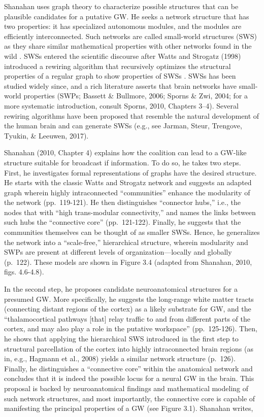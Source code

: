 \documentclass[12pt,twoside]{reedthesis}
\begin{document}
Shanahan uses graph theory to characterize possible structures that can be plausible candidates for a putative GW. He seeks a network structure that has two properties: it has specialized autonomous modules, and the modules are efficiently interconnected. Such networks are called small-world structures (SWS) as they share similar mathematical properties with other networks found in the wild . SWSs entered the scientific discourse after Watts and Strogatz (1998) introduced a rewiring algorithm that recursively optimizes the structural properties of a regular graph to show properties of SWSs . SWSs has been studied widely since, and a rich literature asserts that brain networks have small-world properties (SWPs; Bassett \& Bullmore, 2006; Sporns \& Zwi, 2004; for a more systematic introduction, consult Sporns, 2010, Chapters 3--4). Several rewiring algorithms have been proposed that resemble the natural development of the human brain and can generate SWSs (e.g., see Jarman, Steur, Trengove, Tyukin, \& Leeuwen, 2017).

Shanahan (2010, Chapter 4) explains how the coalition can lead to a GW-like structure suitable for broadcast if information. To do so, he takes two steps. First, he investigates formal representations of graphs have the desired structure. He starts with the classic Watts and Strogatz network and suggests an adapted graph wherein highly intraconnected ``communities'' enhance the modularity of the network (pp.~119-121). He then distinguishes ``connector hubs,'' i.e., the nodes that with ``high trans-modular connectivity,'' and names the links between such hubs the ``connective core'' (pp.~121-122). Finally, he suggests that the communities themselves can be thought of as smaller SWSs. Hence, he generalizes the network into a ``scale-free,'' hierarchical structure, wherein modularity and SWPs are present at different levels of organization---locally and globally (p.~122). These models are shown in Figure 3.4 (adapted from Shanahan, 2010, figs. 4.6-4.8).

In the second step, he proposes candidate neuroanatomical structures for a presumed GW. More specifically, he suggests the long-range white matter tracts (connecting distant regions of the cortex) as a likely substrate for GW, and the ``thalamocortical pathways {[}that{]} relay traffic to and from different parts of the cortex, and may also play a role in the putative workspace'' (pp.~125-126). Then, he shows that applying the hierarchical SWS introduced in the first step to structural parcellation of the cortex into highly intraconnected brain regions (as in, e.g., Hagmann et al., 2008) yields a similar network structure (p.~126). Finally, he distinguishes a ``connective core'' within the anatomical network and concludes that it is indeed the possible locus for a neural GW in the brain. This proposal is backed by neuroanatomical findings and mathematical modeling of such network structures, and most importantly, the connective core is capable of manifesting the principal properties of a GW (see Figure 3.1). Shanahan writes,
\end{document}
